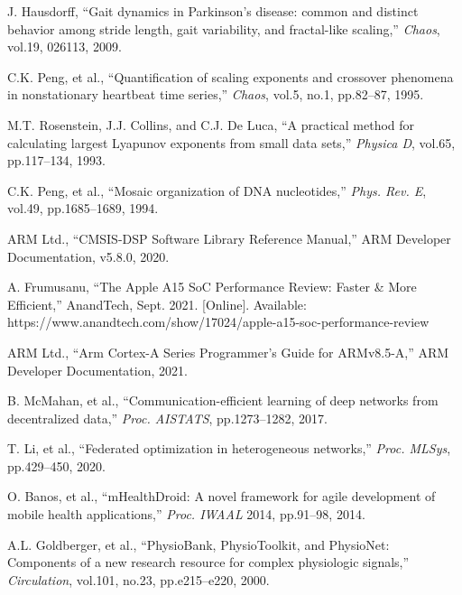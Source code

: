 \documentclass[paper]{ieicej}
\begin{document}
\begin{thebibliography}{99}
J. Hausdorff, ``Gait dynamics in Parkinson's disease: common and distinct behavior among stride length, gait variability, and fractal-like scaling,'' \textit{Chaos}, vol.19, 026113, 2009.

C.K. Peng, et al., ``Quantification of scaling exponents and crossover phenomena in nonstationary heartbeat time series,'' \textit{Chaos}, vol.5, no.1, pp.82--87, 1995.

M.T. Rosenstein, J.J. Collins, and C.J. De Luca, ``A practical method for calculating largest Lyapunov exponents from small data sets,'' \textit{Physica D}, vol.65, pp.117--134, 1993.

C.K. Peng, et al., ``Mosaic organization of DNA nucleotides,'' \textit{Phys. Rev. E}, vol.49, pp.1685--1689, 1994.

ARM Ltd., ``CMSIS-DSP Software Library Reference Manual,'' ARM Developer Documentation, v5.8.0, 2020.

A. Frumusanu, ``The Apple A15 SoC Performance Review: Faster & More Efficient,'' AnandTech, Sept. 2021. [Online]. Available: https://www.anandtech.com/show/17024/apple-a15-soc-performance-review

ARM Ltd., ``Arm Cortex-A Series Programmer's Guide for ARMv8.5-A,'' ARM Developer Documentation, 2021.

B. McMahan, et al., ``Communication-efficient learning of deep networks from decentralized data,'' \textit{Proc. AISTATS}, pp.1273--1282, 2017.

T. Li, et al., ``Federated optimization in heterogeneous networks,'' \textit{Proc. MLSys}, pp.429--450, 2020.

O. Banos, et al., ``mHealthDroid: A novel framework for agile development of mobile health applications,'' \textit{Proc. IWAAL} 2014, pp.91--98, 2014.

A.L. Goldberger, et al., ``PhysioBank, PhysioToolkit, and PhysioNet: Components of a new research resource for complex physiologic signals,'' \textit{Circulation}, vol.101, no.23, pp.e215--e220, 2000.

\end{thebibliography}
\end{document}
